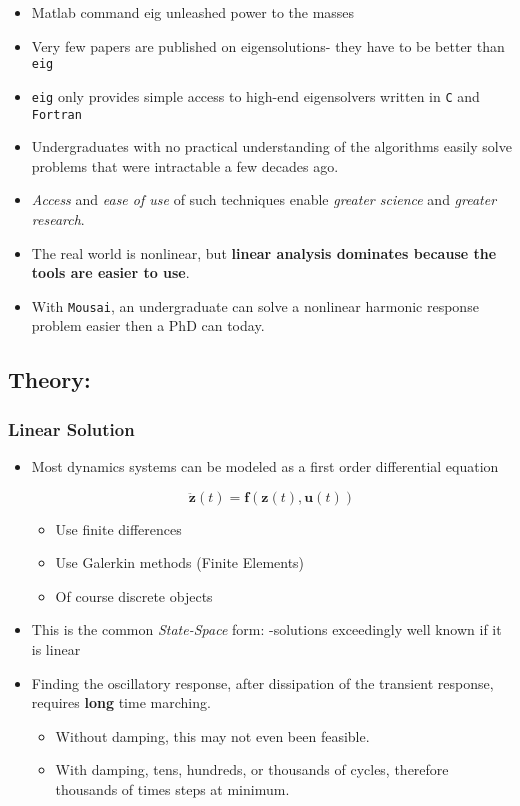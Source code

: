 \documentclass[11pt]{article}
\providecommand{\tightlist}{%
      \setlength{\itemsep}{0pt}\setlength{\parskip}{0pt}}
\begin{document}
\begin{itemize}
\tightlist
\item
  Matlab command eig unleashed power to the masses
\item
  Very few papers are published on eigensolutions- they have to be
  better than \texttt{eig}
\item
  \texttt{eig} only provides simple access to high-end eigensolvers
  written in \texttt{C} and \texttt{Fortran}
\item
  Undergraduates with no practical understanding of the algorithms
  easily solve problems that were intractable a few decades ago.
\item
  \emph{Access} and \emph{ease of use} of such techniques enable
  \emph{greater science} and \emph{greater research}.
\item
  The real world is nonlinear, but \textbf{linear analysis dominates
  because the tools are easier to use}.
\item
  With \texttt{Mousai}, an undergraduate can solve a nonlinear harmonic
  response problem easier then a PhD can today.
\end{itemize}

    \subsection{Theory:}\label{theory}

\subsubsection{Linear Solution}\label{linear-solution}

\begin{itemize}
\item
  Most dynamics systems can be modeled as a first order differential
  equation

  \begin{equation}
  \ddot{\mathbf{z}}(t)=\mathbf{f}(\mathbf{z}(t),\mathbf{u}(t))
  \end{equation}

  \begin{itemize}
  \tightlist
  \item
    Use finite differences
  \item
    Use Galerkin methods (Finite Elements)
  \item
    Of course discrete objects
  \end{itemize}
\item
  This is the common \emph{State-Space} form: -solutions exceedingly
  well known if it is linear
\item
  Finding the oscillatory response, after dissipation of the transient
  response, requires \textbf{long} time marching.

  \begin{itemize}
  \tightlist
  \item
    Without damping, this may not even been feasible.
  \item
    With damping, tens, hundreds, or thousands of cycles, therefore
    thousands of times steps at minimum.
  \end{itemize}
\end{itemize}
\end{document}
